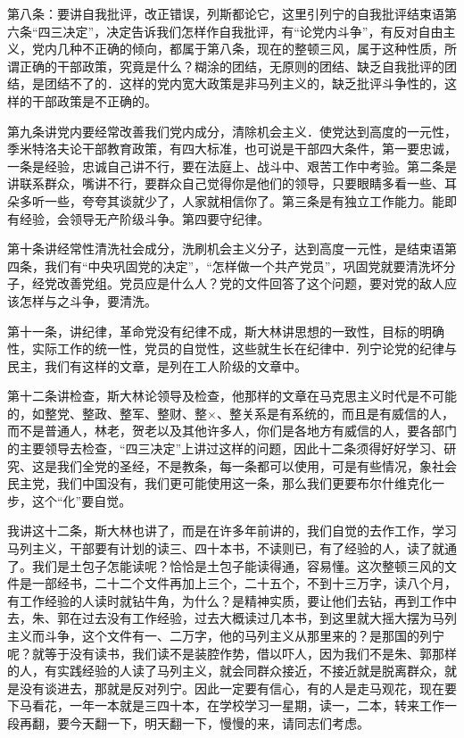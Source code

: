 第八条：要讲自我批评，改正错误，列斯都论它，这里引列宁的自我批评结束语第六条“四三决定”，决定告诉我们怎样作自我批评，有“论党内斗争”，有反对自由主义，党内几种不正确的倾向，都属于第八条，现在的整顿三风，属于这种性质，所谓正确的干部政策，究竟是什么？糊涂的团结，无原则的团结、缺乏自我批评的团结，是团结不了的．这样的党内宽大政策是非马列主义的，缺乏批评斗争性的，这样的干部政策是不正确的。

第九条讲党内要经常改善我们党内成分，清除机会主义．使党达到高度的一元性，季米特洛夫论干部教育政策，有四大标准，也可说是干部四大条件，第一要忠诚，一条是经验，忠诚自己讲不行，要在法庭上、战斗中、艰苦工作中考验。第二条是讲联系群众，嘴讲不行，要群众自己觉得你是他们的领导，只要眼睛多看一些、耳朵多听一些，夸夸其谈就少了，人家就相信你了。第三条是有独立工作能力。能即有经验，会领导无产阶级斗争。第四要守纪律。

第十条讲经常性清洗社会成分，洗刷机会主义分子，达到高度一元性，是结束语第四条，我们有“中央巩固党的决定”，“怎样做一个共产党员”，巩固党就要清洗坏分子，经党改善党组。党员应是什么人？党的文件回答了这个问题，要对党的敌人应该怎样与之斗争，要清洗。

第十一条，讲纪律，革命党没有纪律不成，斯大林讲思想的一致性，目标的明确性，实际工作的统一性，党员的自觉性，这些就生长在纪律中．列宁论党的纪律与民主，我们有这样的文章，是列在工人阶级的文章中。

第十二条讲检查，斯大林论领导及检查，他那样的文章在马克思主义时代是不可能的，如整党、整政、整军、整财、整×、整关系是有系统的，而且是有威信的人，而不是普通人，林老，贺老以及其他许多人，你们是各地方有威信的人，要各部门的主要领导去检查，“四三决定”上讲过这样的问题，因此十二条须得好好学习、研究、这是我们全党的圣经，不是教条，每一条都可以使用，可是有些情况，象社会民主党，我们中国没有，我们更可能使用这一条，那么我们更要布尔什维克化一步，这个“化”要自觉。

我讲这十二条，斯大林也讲了，而是在许多年前讲的，我们自觉的去作工作，学习马列主义，干部要有计划的读三、四十本书，不读则已，有了经验的人，读了就通了。我们是土包子怎能读呢？恰恰是土包子能读得通，容易懂。这次整顿三风的文件是一部经书，二十二个文件再加上三个，二十五个，不到十三万字，读八个月，有工作经验的人读时就钻牛角，为什么？是精神实质，要让他们去钻，再到工作中去，朱、郭在过去没有工作经验，过去大概读过几本书，到这里就大摇大摆为马列主义而斗争，这个文件有一、二万字，他的马列主义从那里来的？是那国的列宁呢？就等于没有读书，我们读不是装腔作势，借以吓人，因为我们不是朱、郭那样的人，有实践经验的人读了马列主义，就会同群众接近，不接近就是脱离群众，就是没有谈进去，那就是反对列宁。因此一定要有信心，有的人是走马观花，现在要下马看花，一年一本就是三四十本，在学校学习一星期，读一，二本，转来工作一段再翻，要今天翻一下，明天翻一下，慢慢的来，请同志们考虑。

